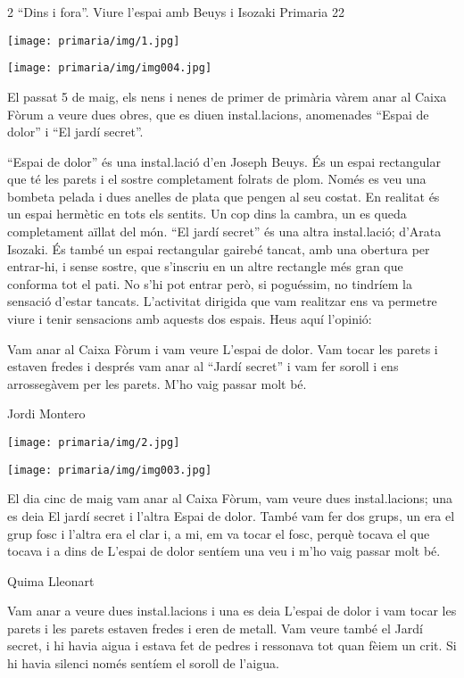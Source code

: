 \begin{news}
{2} %
{“Dins i fora”. Viure l’espai amb Beuys i Isozaki}
{}
{Primaria}
{22} %

\noindent\texttt{[image: primaria/img/1.jpg]}

\noindent\texttt{[image: primaria/img/img004.jpg]}



El passat 5 de maig, els nens i nenes de primer de primària vàrem anar al Caixa Fòrum a veure dues obres, que es diuen instal.lacions, anomenades “Espai de dolor” i “El jardí secret”.

“Espai de dolor” és una instal.lació d’en Joseph Beuys. És un espai rectangular que té les parets i el sostre completament folrats de plom. Només es veu una bombeta pelada i dues anelles de plata que pengen al seu costat. En realitat és un espai hermètic en tots els sentits. Un cop dins la cambra, un es queda completament aïllat del món.
“El jardí secret” és una altra instal.lació; d’Arata Isozaki. És també un espai rectangular gairebé tancat, amb una obertura per entrar-hi, i sense sostre, que s’inscriu en un altre rectangle més gran que conforma tot el pati. No s’hi pot entrar però, si poguéssim, no tindríem la sensació d’estar tancats.
L’activitat dirigida que vam realitzar ens va permetre viure i tenir sensacions amb aquests dos espais. Heus aquí  l’opinió:


Vam anar al Caixa Fòrum i vam veure L’espai de dolor. Vam tocar les parets i estaven fredes i després vam anar al “Jardí secret” i vam fer soroll i ens arrossegàvem per les parets. M’ho vaig passar molt bé.

Jordi Montero


\noindent\texttt{[image: primaria/img/2.jpg]}

\noindent\texttt{[image: primaria/img/img003.jpg]}

El dia cinc de maig vam anar al Caixa Fòrum, vam veure dues instal.lacions; una es deia El jardí secret i l’altra Espai de dolor. També vam fer dos grups, un era el grup fosc i l’altra era el clar i, a mi, em va tocar el fosc, perquè tocava el que tocava i a dins de L’espai de dolor sentíem una veu i m’ho vaig passar molt bé.


Quima Lleonart

Vam anar a veure dues instal.lacions i una es deia L’espai de dolor i vam tocar les parets i les parets estaven fredes i eren de metall. Vam veure també el Jardí secret, i hi havia aigua i estava fet de pedres i ressonava tot quan fèiem un crit. Si hi havia silenci només sentíem el soroll de l’aigua.


\end{news}

